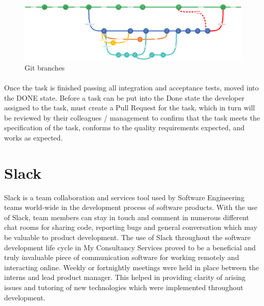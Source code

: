 \begin{figure}
\includegraphics[width=\textwidth]{img/branch.png}
\caption{Git branches}
\label{fig:branches}
\end{figure}

\paragraph{}
Once the task is finished passing all integration and acceptance tests, moved into the DONE state. Before a task can be put into the Done state the developer assigned to the task, must create a Pull Request for the task, which in turn will be reviewed by their colleagues / management to confirm that the task meets the specification of the task, conforms to the quality requirements expected, and works as expected\cite{driessen}.

\section{Slack}

Slack is a team collaboration and services tool used by Software Engineering teams world-wide in the development process of software products. With the use of Slack, team members can stay in touch and comment in numerous different chat rooms for sharing code, reporting bugs and general conversation which may be valuable to product development. The use of Slack throughout the software development life cycle in My Consultancy Services proved to be a beneficial and truly invaluable piece of communication software for working remotely and interacting online. Weekly or fortnightly meetings were held in place between the interns and lead product manager. This helped in providing clarity of arising issues and tutoring of new technologies which were implemented throughout development.